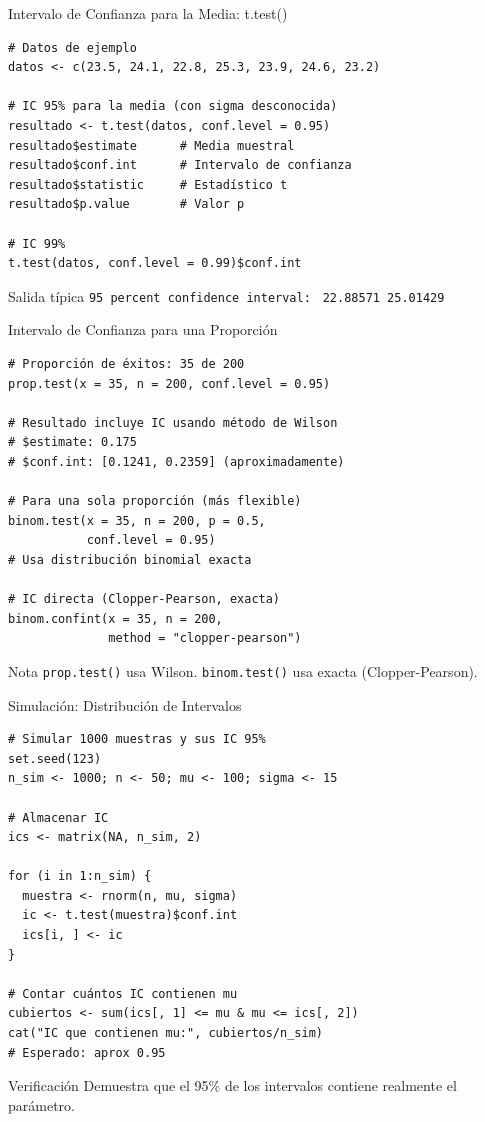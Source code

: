 \documentclass[aspectratio=169,11pt]{beamer}
\begin{document}
\begin{frame}[fragile]{Intervalo de Confianza para la Media: t.test()}
\begin{lstlisting}
# Datos de ejemplo
datos <- c(23.5, 24.1, 22.8, 25.3, 23.9, 24.6, 23.2)

# IC 95% para la media (con sigma desconocida)
resultado <- t.test(datos, conf.level = 0.95)
resultado$estimate      # Media muestral
resultado$conf.int      # Intervalo de confianza
resultado$statistic     # Estadístico t
resultado$p.value       # Valor p

# IC 99%
t.test(datos, conf.level = 0.99)$conf.int
\end{lstlisting}

\pause

\begin{exampleblock}{Salida típica}
\verb|95 percent confidence interval:|
\verb| 22.88571 25.01429|
\end{exampleblock}
\end{frame}

\begin{frame}[fragile]{Intervalo de Confianza para una Proporción}
\begin{lstlisting}
# Proporción de éxitos: 35 de 200
prop.test(x = 35, n = 200, conf.level = 0.95)

# Resultado incluye IC usando método de Wilson
# $estimate: 0.175
# $conf.int: [0.1241, 0.2359] (aproximadamente)

# Para una sola proporción (más flexible)
binom.test(x = 35, n = 200, p = 0.5,
           conf.level = 0.95)
# Usa distribución binomial exacta

# IC directa (Clopper-Pearson, exacta)
binom.confint(x = 35, n = 200,
              method = "clopper-pearson")
\end{lstlisting}

\pause

\begin{alertblock}{Nota}
\verb|prop.test()| usa Wilson. \verb|binom.test()| usa exacta (Clopper-Pearson).
\end{alertblock}
\end{frame}

\begin{frame}[fragile]{Simulación: Distribución de Intervalos}
\begin{lstlisting}[basicstyle=\ttfamily\tiny]
# Simular 1000 muestras y sus IC 95%
set.seed(123)
n_sim <- 1000; n <- 50; mu <- 100; sigma <- 15

# Almacenar IC
ics <- matrix(NA, n_sim, 2)

for (i in 1:n_sim) {
  muestra <- rnorm(n, mu, sigma)
  ic <- t.test(muestra)$conf.int
  ics[i, ] <- ic
}

# Contar cuántos IC contienen mu
cubiertos <- sum(ics[, 1] <= mu & mu <= ics[, 2])
cat("IC que contienen mu:", cubiertos/n_sim)
# Esperado: aprox 0.95
\end{lstlisting}

\pause
\small
\begin{block}{Verificación}
Demuestra que el 95\% de los intervalos contiene realmente el parámetro.
\end{block}
\end{frame}
\end{document}
